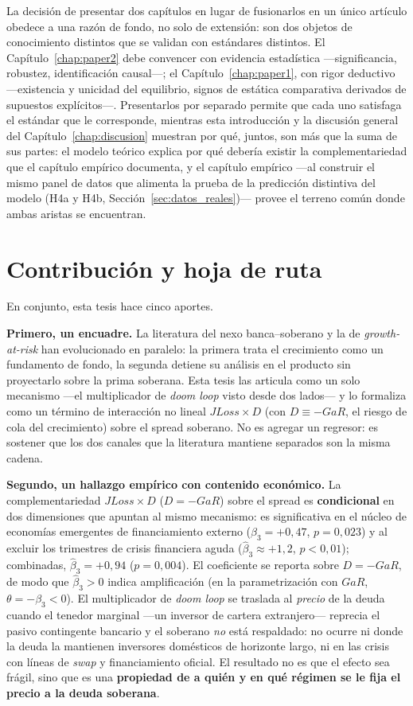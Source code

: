 La decisión de presentar dos capítulos en lugar de fusionarlos en un único artículo obedece a una razón de fondo, no solo de extensión: son dos objetos de conocimiento distintos que se validan con estándares distintos. El Capítulo~\ref{chap:paper2} debe convencer con evidencia estadística —significancia, robustez, identificación causal—; el Capítulo~\ref{chap:paper1}, con rigor deductivo —existencia y unicidad del equilibrio, signos de estática comparativa derivados de supuestos explícitos—. Presentarlos por separado permite que cada uno satisfaga el estándar que le corresponde, mientras esta introducción y la discusión general del Capítulo~\ref{chap:discusion} muestran por qué, juntos, son más que la suma de sus partes: el modelo teórico explica por qué debería existir la complementariedad que el capítulo empírico documenta, y el capítulo empírico —al construir el mismo panel de datos que alimenta la prueba de la predicción distintiva del modelo (H4a y H4b, Sección~\ref{sec:datos_reales})— provee el terreno común donde ambas aristas se encuentran.

\section{Contribución y hoja de ruta}

En conjunto, esta tesis hace cinco aportes.

\textbf{Primero, un encuadre.} La literatura del nexo banca--soberano y la de \textit{growth-at-risk} han evolucionado en paralelo: la primera trata el crecimiento como un fundamento de fondo, la segunda detiene su análisis en el producto sin proyectarlo sobre la prima soberana. Esta tesis las articula como un solo mecanismo —el multiplicador de \textit{doom loop} visto desde dos lados— y lo formaliza como un término de interacción no lineal $JLoss\times D$ (con $D\equiv-GaR$, el riesgo de cola del crecimiento) sobre el spread soberano. No es agregar un regresor: es sostener que los dos canales que la literatura mantiene separados son la misma cadena.

\textbf{Segundo, un hallazgo empírico con contenido económico.} La complementariedad $JLoss\times D$ ($D=-GaR$) sobre el spread es \textbf{condicional} en dos dimensiones que apuntan al mismo mecanismo: es significativa en el núcleo de economías emergentes de financiamiento externo ($\hat\beta_3=+0{,}47$, $p=0{,}023$) y al excluir los trimestres de crisis financiera aguda ($\hat\beta_3\approx+1{,}2$, $p<0{,}01$); combinadas, $\hat\beta_3=+0{,}94$ ($p=0{,}004$). El coeficiente se reporta sobre $D=-GaR$, de modo que $\hat\beta_3>0$ indica amplificación (en la parametrización con $GaR$, $\theta=-\beta_3<0$). El multiplicador de \textit{doom loop} se traslada al \emph{precio} de la deuda cuando el tenedor marginal —un inversor de cartera extranjero— reprecia el pasivo contingente bancario y el soberano \emph{no} está respaldado: no ocurre ni donde la deuda la mantienen inversores domésticos de horizonte largo, ni en las crisis con líneas de \textit{swap} y financiamiento oficial. El resultado no es que el efecto sea frágil, sino que es una \textbf{propiedad de a quién y en qué régimen se le fija el precio a la deuda soberana}.

